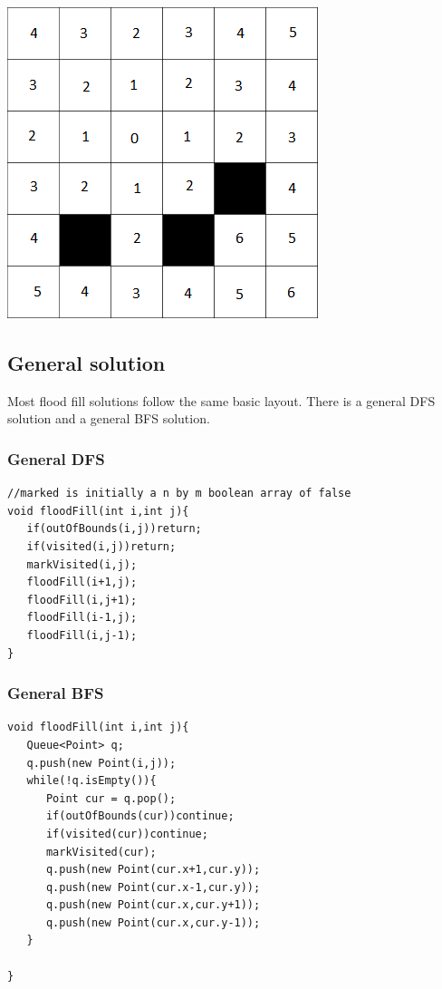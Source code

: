 \documentclass[11pt,oneside]{book}
\makeatletter
\def\maxwidth#1{\ifdim\Gin@nat@width>#1 #1\else\Gin@nat@width\fi}
\makeatother
\begin{document}
\vspace{5px}\includegraphics[width=\maxwidth{\textwidth}]{floodfill.png}

\subsection{General solution}

Most flood fill solutions follow the same basic layout. There is a general DFS solution and a general BFS solution.

\subsubsection{General DFS}

\begin{lstlisting}
//marked is initially a n by m boolean array of false
void floodFill(int i,int j){
   if(outOfBounds(i,j))return;
   if(visited(i,j))return;
   markVisited(i,j);
   floodFill(i+1,j);
   floodFill(i,j+1);
   floodFill(i-1,j);
   floodFill(i,j-1);
}
\end{lstlisting}

\subsubsection{General BFS}

\begin{lstlisting}
void floodFill(int i,int j){
   Queue<Point> q;
   q.push(new Point(i,j));
   while(!q.isEmpty()){
      Point cur = q.pop();
      if(outOfBounds(cur))continue;
      if(visited(cur))continue;
      markVisited(cur);
      q.push(new Point(cur.x+1,cur.y));
      q.push(new Point(cur.x-1,cur.y));
      q.push(new Point(cur.x,cur.y+1));
      q.push(new Point(cur.x,cur.y-1));
   }
   
}
\end{lstlisting}
\end{document}
